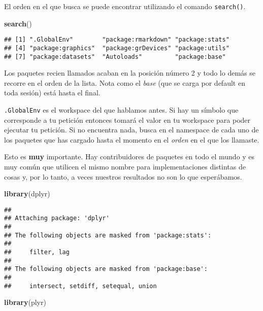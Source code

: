\documentclass[]{article}
\newenvironment{Shaded}{\begin{snugshade}}{\end{snugshade}}
\newcommand{\KeywordTok}[1]{\textcolor[rgb]{0.13,0.29,0.53}{\textbf{{#1}}}}
\newcommand{\NormalTok}[1]{{#1}}
\begin{document}
El orden en el que busca se puede encontrar utilizando el comando
\texttt{search()}.

\begin{Shaded}
\begin{Highlighting}[]
\KeywordTok{search}\NormalTok{()}
\end{Highlighting}
\end{Shaded}

\begin{verbatim}
## [1] ".GlobalEnv"        "package:rmarkdown" "package:stats"    
## [4] "package:graphics"  "package:grDevices" "package:utils"    
## [7] "package:datasets"  "Autoloads"         "package:base"
\end{verbatim}

Los paquetes recien llamados acaban en la posición número 2 y todo lo
demás se recorre en el orden de la lista. Nota como el \emph{base} (que
se carga por default en toda sesión) está hasta el final.

\texttt{.GlobalEnv} es el workspace del que hablamos antes. Si hay un
símbolo que corresponde a tu petición entonces tomará el valor en tu
workspace para poder ejecutar tu petición. Si no encuentra nada, busca
en el namespace de cada uno de los paquetes que has cargado hasta el
momento en el \emph{orden} en el que los llamaste.

Esto es \textbf{muy} importante. Hay contribuidores de paquetes en todo
el mundo y es muy común que utilicen el mismo nombre para
implementaciones distintas de cosas y, por lo tanto, a veces nuestros
resultados no son lo que esperábamos.

\begin{Shaded}
\begin{Highlighting}[]
\KeywordTok{library}\NormalTok{(dplyr)}
\end{Highlighting}
\end{Shaded}

\begin{verbatim}
## 
## Attaching package: 'dplyr'
## 
## The following objects are masked from 'package:stats':
## 
##     filter, lag
## 
## The following objects are masked from 'package:base':
## 
##     intersect, setdiff, setequal, union
\end{verbatim}

\begin{Shaded}
\begin{Highlighting}[]
\KeywordTok{library}\NormalTok{(plyr)}
\end{Highlighting}
\end{Shaded}
\end{document}
